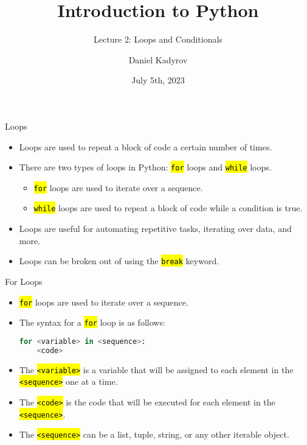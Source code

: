\documentclass[
    aspectratio=169, 
    usepdftitle=false, 
    xcolor={dvipsnames},
    hyperref={
        colorlinks,
        linkcolor=black,
        urlcolor=blue}
    ]{beamer}
\title[Introduction to Python]{Introduction to Python}
\subtitle{Lecture 2: Loops and Conditionals}
\author{Daniel Kadyrov}
\date{July 5th, 2023}
\let\OldTexttt\texttt
\renewcommand{\texttt}[1]{\OldTexttt{\hl{#1}}}%
\begin{document}
\begin{frame}
    \titlepage
\end{frame}

\begin{frame}{Loops}
    \begin{itemize}
        \item Loops are used to repeat a block of code a certain number of times.
        \item There are two types of loops in Python: \texttt{for} loops and \texttt{while} loops.
        \begin{itemize}
            \item \texttt{for} loops are used to iterate over a sequence.
            \item \texttt{while} loops are used to repeat a block of code while a condition is true.
        \end{itemize}
        \item Loops are useful for automating repetitive tasks, iterating over data, and more.
        \item Loops can be broken out of using the \texttt{break} keyword.
    \end{itemize}
\end{frame}

\begin{frame}[fragile]{For Loops}
    \begin{itemize}
        \item \texttt{for} loops are used to iterate over a sequence.
        \item The syntax for a \texttt{for} loop is as follows:
        \begin{lstlisting}[language=Python]
for <variable> in <sequence>:
    <code>
        \end{lstlisting}
        \item The \texttt{<variable>} is a variable that will be assigned to each element in the \texttt{<sequence>} one at a time.
        \item The \texttt{<code>} is the code that will be executed for each element in the \texttt{<sequence>}.
        \item The \texttt{<sequence>} can be a list, tuple, string, or any other iterable object.
    \end{itemize}
\end{frame}
\end{document}
